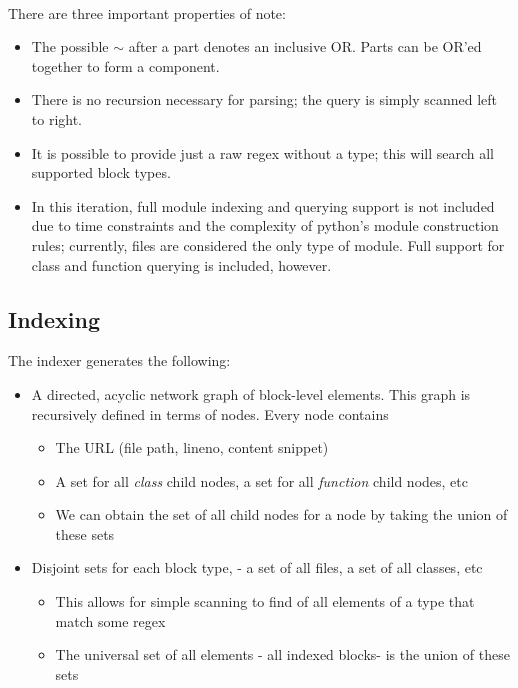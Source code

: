 \documentclass{article}
\begin{document}
\paragraph{}
There are three important properties of note:
	\begin{itemize}
	\item The possible $\sim$ after a part denotes an inclusive OR. Parts can be OR'ed together to form a component.
    \item There is no recursion necessary for parsing; the query is simply scanned left to right.
   	\item It is possible to provide just a raw regex without a type; this will search all supported block types.
    \item In this iteration, full module indexing and querying support is not included due to time constraints and the complexity of python's module construction rules; currently, files are considered the only type of module. Full support for class and function querying is included, however.
	\end{itemize}
	
\subsection{Indexing}
The indexer\cite{InfoRet} generates the following:
	\begin{itemize}
	\item A directed, acyclic network graph of block-level elements. This graph is recursively defined in terms of nodes. Every node contains
       \begin{itemize} 
       	\item The URL (file path, lineno, content snippet)
        \item A set for all \emph{class} child nodes, a set for all \emph{function} child nodes, etc
        \item We can obtain the set of all child nodes for a node by taking the union of these sets
       \end{itemize}
    \item Disjoint sets for each block type, - a set of all files, a set of all classes, etc
    	\begin{itemize}
    	\item This allows for simple scanning to find of all elements of a type that match some regex
    	\item The universal set of all elements - all indexed blocks- is the union of these sets
    	\end{itemize}
	\end{itemize}
\end{document}
